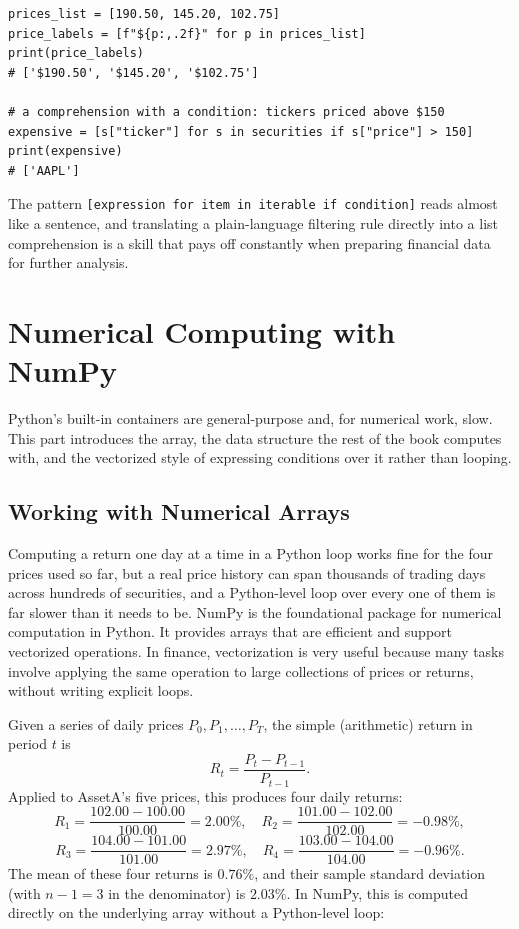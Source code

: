 \documentclass[../ai_in_finance]{subfiles}
\begin{document}
\begin{verbatim}
prices_list = [190.50, 145.20, 102.75]
price_labels = [f"${p:,.2f}" for p in prices_list]
print(price_labels)
# ['$190.50', '$145.20', '$102.75']

# a comprehension with a condition: tickers priced above $150
expensive = [s["ticker"] for s in securities if s["price"] > 150]
print(expensive)
# ['AAPL']
\end{verbatim}

The pattern \texttt{[expression for item in iterable if condition]} reads almost like a sentence, and translating a plain-language filtering rule directly into a list comprehension is a skill that pays off constantly when preparing financial data for further analysis.

\section{Numerical Computing with NumPy}

Python's built-in containers are general-purpose and, for numerical work, slow. This part introduces the array, the data structure the rest of the book computes with, and the vectorized style of expressing conditions over it rather than looping.

\subsection{Working with Numerical Arrays}
\label{sec:vectorization}

Computing a return one day at a time in a Python loop works fine for the four prices used so far, but a real price history can span thousands of trading days across hundreds of securities, and a Python-level loop over every one of them is far slower than it needs to be. NumPy is the foundational package for numerical computation in Python. It provides arrays that are efficient and support vectorized operations. In finance, vectorization is very useful because many tasks involve applying the same operation to large collections of prices or returns, without writing explicit loops.

Given a series of daily prices $P_0, P_1, \dots, P_T$, the simple (arithmetic) return in period $t$ is
\begin{equation*}
R_t = \frac{P_t - P_{t-1}}{P_{t-1}}.
\end{equation*}
Applied to AssetA's five prices, this produces four daily returns:
\begin{equation*}
R_1 = \frac{102.00 - 100.00}{100.00} = 2.00\%, \quad
R_2 = \frac{101.00 - 102.00}{102.00} = -0.98\%,
\end{equation*}
\begin{equation*}
R_3 = \frac{104.00 - 101.00}{101.00} = 2.97\%, \quad
R_4 = \frac{103.00 - 104.00}{104.00} = -0.96\%.
\end{equation*}
The mean of these four returns is $0.76\%$, and their sample standard deviation (with $n-1=3$ in the denominator) is $2.03\%$. In NumPy, this is computed directly on the underlying array without a Python-level loop:
\end{document}
